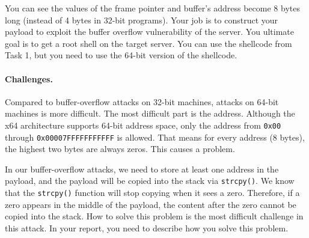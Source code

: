 You can see the values of the frame pointer and buffer's address
become 8 bytes long (instead of 4 bytes in 32-bit programs).
Your job is to construct your payload to exploit the buffer overflow
vulnerability of the server. 
You ultimate goal is to get a root shell on 
the target server. 
You can use the shellcode from Task 1, but 
you need to use the 64-bit version of the shellcode. 
\fi


\paragraph{Challenges.} Compared to buffer-overflow attacks on 32-bit 
machines, attacks on 64-bit machines is more difficult. The most 
difficult part is the address. Although the x64 architecture 
supports 64-bit address space, only the address from 
\texttt{0x00} through \texttt{0x00007FFFFFFFFFFF} is allowed. That means for 
every address (8 bytes), the highest two bytes are always zeros. 
This causes a problem.

In our buffer-overflow attacks, we need to store at least one address 
in the payload, and the payload will be copied into the stack via
\texttt{strcpy()}. We know that the \texttt{strcpy()} function
will stop copying when it sees a zero. Therefore, if a zero 
appears in the middle of the payload, the content after the 
zero cannot be copied into the stack. How to solve this 
problem is the most difficult challenge in this attack. In your 
report, you need to describe how you solve this problem. 


